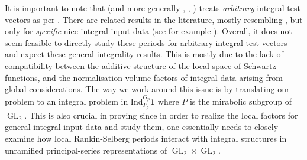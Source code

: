 \documentclass{amsart}%
\theoremstyle{plain}
\theoremstyle{plain}
\theoremstyle{remark}
\DeclareMathOperator{\GL}{GL}
\begin{document}
It is important to note that  (and more generally , , ) treats \textit{arbitrary} integral test vectors as per . There are related results in the literature, mostly resembling , but only for \textit{specific} nice integral input data (see for example \cite[\S $4$]{grossi2020norm}). Overall, it does not seem feasible to directly study these periods for arbitrary integral test vectors and expect these general integrality results. This is mostly due to the lack of compatibility between the additive structure of the local space of Schwartz functions, and the normalisation volume factors of integral data arising from global considerations. The way we work around this issue is by translating our problem to an integral problem in $\mathrm{Ind}_{P_p}^{G_p}\mathbf{1}$ where $P$ is the mirabolic subgroup of $\GL_2$. This is also crucial in proving  since in order to realize the local factors for general integral input data and study them, one essentially needs to closely examine how local Rankin-Selberg periods interact with integral structures in unramified principal-series representations of $\GL_2\times \GL_2$. 
\end{document}
